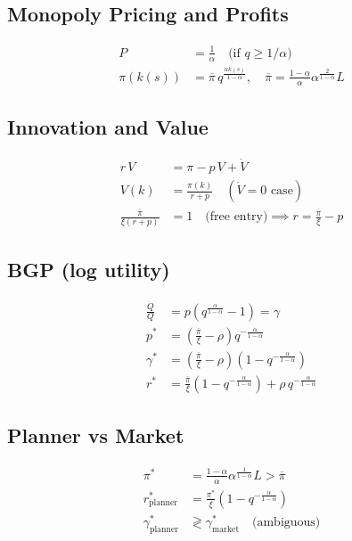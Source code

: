 \documentclass[a4paper,11pt]{article}
\newcommand{\pibar}{\overline{\pi}}
\begin{document}
\subsection*{Monopoly Pricing and Profits}
\begin{align*}
P &= \frac{1}{\alpha} \quad \text{(if } q \geq 1/\alpha\text{)} \tag{Monopoly Price}\\
\pi(k(s)) &= \pibar\, q^{\frac{\alpha k(s)}{1-\alpha}}, \quad \pibar = \frac{1-\alpha}{\alpha}\alpha^{\frac{2}{1-\alpha}}L \tag{Monopoly Profit}
\end{align*}

\subsection*{Innovation and Value}
\begin{align*}
r\,V &= \pi - p\,V + \dot{V} \tag{Bellman / HJB}\\
V(k) &= \frac{\pi(k)}{r + p} \quad (\dot{V}=0 \text{ case}) \tag{Value}\\
\frac{\pibar}{\xi(r+p)} &= 1 \quad \text{(free entry)} \implies r = \frac{\pibar}{\xi} - p \tag{Free Entry}
\end{align*}

\subsection*{BGP (log utility)}
\begin{align*}
\frac{\dot{Q}}{Q} &= p\!\left(q^{\frac{\alpha}{1-\alpha}}-1\right) = \gamma \tag{Quality Growth}\\
p^* &= \left(\frac{\pibar}{\xi} - \rho\right) q^{-\frac{\alpha}{1-\alpha}} \tag{Eqm $p$}\\
\gamma^* &= \left(\frac{\pibar}{\xi} - \rho\right)\!\left(1 - q^{-\frac{\alpha}{1-\alpha}}\right) \tag{BGP Growth}\\
r^* &= \frac{\pibar}{\xi}\!\left(1 - q^{-\frac{\alpha}{1-\alpha}}\right) + \rho\, q^{-\frac{\alpha}{1-\alpha}} \tag{Eqm $r$}
\end{align*}

\subsection*{Planner vs Market}
\begin{align*}
\pi^* &= \frac{1-\alpha}{\alpha}\alpha^{\frac{1}{1-\alpha}}L > \pibar \tag{Planner Profit}\\
r^*_{\text{planner}} &= \frac{\pi^*}{\xi}\!\left(1-q^{-\frac{\alpha}{1-\alpha}}\right) \tag{Planner Rate}\\
\gamma^*_{\text{planner}} &\gtrless \gamma^*_{\text{market}} \quad \text{(ambiguous)} \tag{Welfare}
\end{align*}
\end{document}
